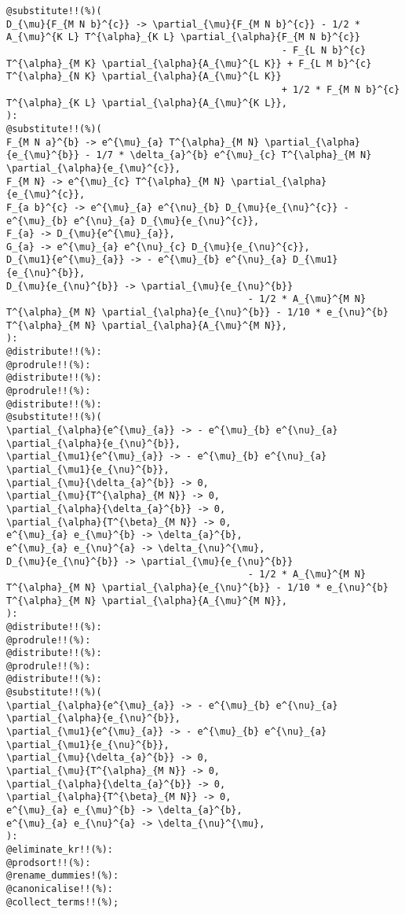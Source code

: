 \documentclass[11pt]{article}
\begin{document}
{\color[named]{Blue}\begin{verbatim}
@substitute!!(%)(
D_{\mu}{F_{M N b}^{c}} -> \partial_{\mu}{F_{M N b}^{c}} - 1/2 * A_{\mu}^{K L} T^{\alpha}_{K L} \partial_{\alpha}{F_{M N b}^{c}}
                                                 - F_{L N b}^{c} T^{\alpha}_{M K} \partial_{\alpha}{A_{\mu}^{L K}} + F_{L M b}^{c} T^{\alpha}_{N K} \partial_{\alpha}{A_{\mu}^{L K}}
                                                 + 1/2 * F_{M N b}^{c} T^{\alpha}_{K L} \partial_{\alpha}{A_{\mu}^{K L}},
):
@substitute!!(%)(
F_{M N a}^{b} -> e^{\mu}_{a} T^{\alpha}_{M N} \partial_{\alpha}{e_{\mu}^{b}} - 1/7 * \delta_{a}^{b} e^{\mu}_{c} T^{\alpha}_{M N} \partial_{\alpha}{e_{\mu}^{c}},
F_{M N} -> e^{\mu}_{c} T^{\alpha}_{M N} \partial_{\alpha}{e_{\mu}^{c}},
F_{a b}^{c} -> e^{\mu}_{a} e^{\nu}_{b} D_{\mu}{e_{\nu}^{c}} - e^{\mu}_{b} e^{\nu}_{a} D_{\mu}{e_{\nu}^{c}},
F_{a} -> D_{\mu}{e^{\mu}_{a}},
G_{a} -> e^{\mu}_{a} e^{\nu}_{c} D_{\mu}{e_{\nu}^{c}},
D_{\mu1}{e^{\mu}_{a}} -> - e^{\mu}_{b} e^{\nu}_{a} D_{\mu1}{e_{\nu}^{b}},
D_{\mu}{e_{\nu}^{b}} -> \partial_{\mu}{e_{\nu}^{b}} 
                                           - 1/2 * A_{\mu}^{M N} T^{\alpha}_{M N} \partial_{\alpha}{e_{\nu}^{b}} - 1/10 * e_{\nu}^{b} T^{\alpha}_{M N} \partial_{\alpha}{A_{\mu}^{M N}},
):
@distribute!!(%):
@prodrule!!(%):
@distribute!!(%):
@prodrule!!(%):
@distribute!!(%):
@substitute!!(%)(
\partial_{\alpha}{e^{\mu}_{a}} -> - e^{\mu}_{b} e^{\nu}_{a} \partial_{\alpha}{e_{\nu}^{b}},
\partial_{\mu1}{e^{\mu}_{a}} -> - e^{\mu}_{b} e^{\nu}_{a} \partial_{\mu1}{e_{\nu}^{b}},
\partial_{\mu}{\delta_{a}^{b}} -> 0,
\partial_{\mu}{T^{\alpha}_{M N}} -> 0,
\partial_{\alpha}{\delta_{a}^{b}} -> 0,
\partial_{\alpha}{T^{\beta}_{M N}} -> 0,
e^{\mu}_{a} e_{\mu}^{b} -> \delta_{a}^{b},
e^{\mu}_{a} e_{\nu}^{a} -> \delta_{\nu}^{\mu},
D_{\mu}{e_{\nu}^{b}} -> \partial_{\mu}{e_{\nu}^{b}} 
                                           - 1/2 * A_{\mu}^{M N} T^{\alpha}_{M N} \partial_{\alpha}{e_{\nu}^{b}} - 1/10 * e_{\nu}^{b} T^{\alpha}_{M N} \partial_{\alpha}{A_{\mu}^{M N}},
):
@distribute!!(%):
@prodrule!!(%):
@distribute!!(%):
@prodrule!!(%):
@distribute!!(%):
@substitute!!(%)(
\partial_{\alpha}{e^{\mu}_{a}} -> - e^{\mu}_{b} e^{\nu}_{a} \partial_{\alpha}{e_{\nu}^{b}},
\partial_{\mu1}{e^{\mu}_{a}} -> - e^{\mu}_{b} e^{\nu}_{a} \partial_{\mu1}{e_{\nu}^{b}},
\partial_{\mu}{\delta_{a}^{b}} -> 0,
\partial_{\mu}{T^{\alpha}_{M N}} -> 0,
\partial_{\alpha}{\delta_{a}^{b}} -> 0,
\partial_{\alpha}{T^{\beta}_{M N}} -> 0,
e^{\mu}_{a} e_{\mu}^{b} -> \delta_{a}^{b},
e^{\mu}_{a} e_{\nu}^{a} -> \delta_{\nu}^{\mu},
):
@eliminate_kr!!(%):
@prodsort!!(%):
@rename_dummies!(%):
@canonicalise!!(%):
@collect_terms!!(%);
\end{verbatim}}
\end{document}
